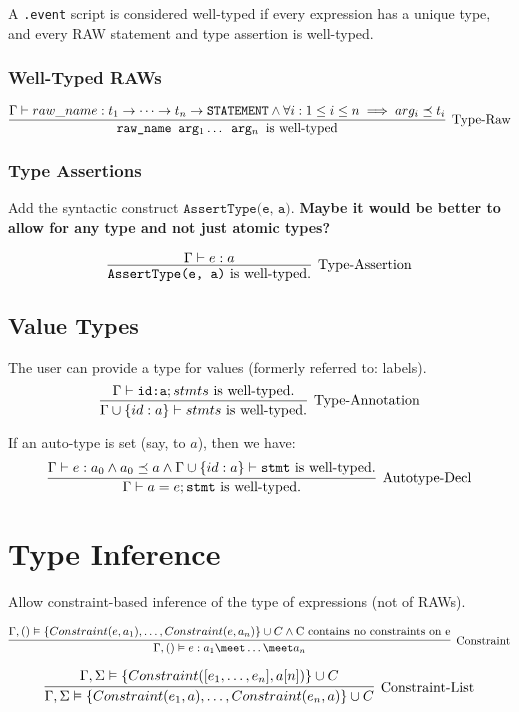 \documentclass[10pt,a4paper]{article}
\begin{document}
A \texttt{.event} script is considered well-typed if every expression has a unique type, and every RAW statement and type assertion  is well-typed.

\subsubsection{Well-Typed RAWs}
$$
\infer[\text{Type-Raw}]
{\texttt{raw\_name arg$_1 \dots$ arg$_n$ } \text{is well-typed}}
{\Gamma \vdash raw\_name : t_1 \rightarrow \dots \rightarrow t_n \rightarrow \texttt{STATEMENT} \wedge \forall i: 1 \leq i \leq n \implies arg_i \preceq t_i}
$$

\subsubsection{Type Assertions}
Add the syntactic construct $\texttt{AssertType(e, a)}$.
{\bf Maybe it would be better to allow for any type and not just atomic types?}

$$
\infer[\text{Type-Assertion}]
{\texttt{AssertType(e, a)} \text{ is well-typed.}}
{\Gamma \vdash e : a}
$$

\subsection{Value Types}
The user can provide a type for values (formerly referred to: labels). 
$$
\infer[\text{Type-Annotation}]
{\Gamma \cup \{id : a\} \vdash stmts \text{ is well-typed.}}
{\Gamma \vdash \texttt{id:a}; stmts \text{ is well-typed.}}
$$

If an auto-type is set (say, to $a$), then we have:
$$
\infer[\text{Autotype-Decl}]
{\Gamma \vdash a = e; \texttt{stmt} \text{ is well-typed.}}
{\Gamma \vdash e : a_0 \wedge a_0 \preceq a \wedge \Gamma \cup \{id : a\} \vdash \texttt{stmt} \text{ is well-typed.}}
$$

\section{Type Inference}
Allow constraint-based inference of the type of expressions (not of RAWs).

$$
\infer[\text{Constraint}]
{\Gamma, () \vDash e : a_1 \meet \dots \meet a_n}
{\Gamma, () \vDash \{Constraint(e, a_1), \dots, Constraint(e, a_n)\} \cup C \wedge \text{C contains no constraints on e}}
$$


$$
\infer[\text{Constraint-List}]
{\Gamma, \Sigma \vDash \{Constraint(e_1, a), \dots, Constraint(e_n, a)\} \cup C}
{\Gamma, \Sigma \vDash \{Constraint([e_1, \dots, e_n], a[n])\}\cup C}
$$
\end{document}
